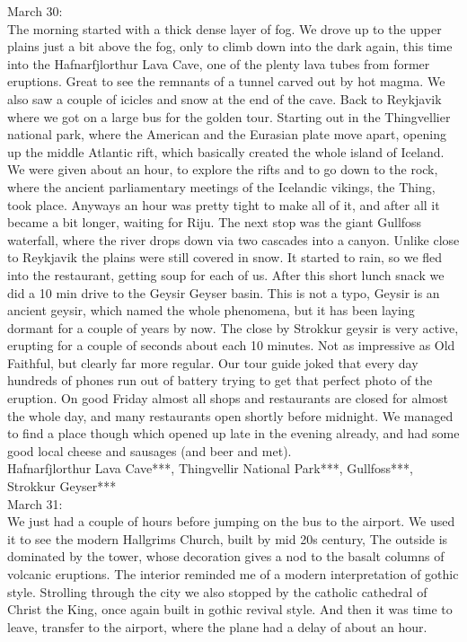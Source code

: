 March 30:\\
The morning started with a thick dense layer of fog. We drove up to the upper plains just a bit above the fog, only to climb down into the dark again, this time into the Hafnarfjlorthur Lava Cave, one of the plenty lava tubes from former eruptions. Great to see the remnants of a tunnel carved out by hot magma. We also saw a couple of icicles and snow at the end of the cave. Back to Reykjavik where we got on a large bus for the golden tour. Starting out in the Thingvellier national park, where the American and the Eurasian plate move apart, opening up the middle Atlantic rift, which basically created the whole island of Iceland. We were given about an hour, to explore the rifts and to go down to the rock, where the ancient parliamentary meetings of the Icelandic vikings, the Thing, took place. Anyways an hour was pretty tight to make all of it, and after all it became a bit longer, waiting for Riju. The next stop was the giant Gullfoss waterfall, where the river drops down via two cascades into a canyon. Unlike close to Reykjavik the plains were still covered in snow. It started to rain, so we fled into the restaurant, getting soup for each of us. After this short lunch snack we did a 10 min drive to the Geysir Geyser basin. This is not a typo, Geysir is an ancient geysir, which named the whole phenomena, but it has been laying dormant for a couple of years by now. The close by Strokkur geysir is very active, erupting for a couple of seconds about each 10 minutes. Not as impressive as Old Faithful, but clearly far more regular. Our tour guide joked that every day hundreds of phones run out of battery trying to get that perfect photo of the eruption. On good Friday almost all shops and restaurants are closed for almost the whole day, and many restaurants open shortly before midnight. We managed to find a place though which opened up late in the evening already, and had some good local cheese and sausages (and beer and met).\\

Hafnarfjlorthur Lava Cave***, Thingvellir National Park***, Gullfoss***, Strokkur Geyser***\\

March 31:\\
We just had a couple of hours before jumping on the bus to the airport. We used it to see the modern Hallgrims Church, built by mid 20s century, The outside is dominated by the tower, whose decoration gives a nod to the basalt columns of volcanic eruptions. The interior reminded me of a modern interpretation of gothic style. Strolling through the city we also stopped by the catholic cathedral of Christ the King, once again built in gothic revival style. And then it was time to leave, transfer to the airport, where the plane had a delay of about an hour.\\

